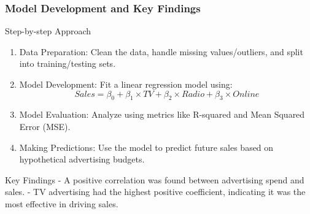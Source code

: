 \documentclass[aspectratio=169]{beamer}
\begin{document}
\begin{frame}[fragile]
    \frametitle{Model Development and Key Findings}
    \begin{block}{Step-by-step Approach}
        \begin{enumerate}
            \item Data Preparation: Clean the data, handle missing values/outliers, and split into training/testing sets.
            \item Model Development: Fit a linear regression model using:
            \begin{equation}
                Sales = \beta_0 + \beta_1 \times TV + \beta_2 \times Radio + \beta_3 \times Online
            \end{equation}
            \item Model Evaluation: Analyze using metrics like R-squared and Mean Squared Error (MSE).
            \item Making Predictions: Use the model to predict future sales based on hypothetical advertising budgets.
        \end{enumerate}
    \end{block}

    \begin{block}{Key Findings}
        - A positive correlation was found between advertising spend and sales.
        - TV advertising had the highest positive coefficient, indicating it was the most effective in driving sales.
    \end{block}
\end{frame}
\end{document}
